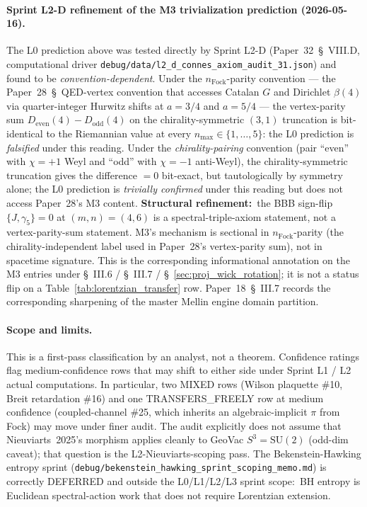 \documentclass[11pt]{article}
\begin{document}
\paragraph{Sprint L2-D refinement of the M3 trivialization prediction
(2026-05-16).}
The L0 prediction above was tested directly by Sprint L2-D
(Paper~32~\S~VIII.D, computational driver
\verb|debug/data/l2_d_connes_axiom_audit_31.json|) and found to be
\emph{convention-dependent}.  Under the
$n_{\mathrm{Fock}}$-parity convention --- the Paper~28~\S~QED-vertex
convention that accesses Catalan $G$ and Dirichlet $\beta(4)$ via
quarter-integer Hurwitz shifts at $a = 3/4$ and $a = 5/4$ --- the
vertex-parity sum $D_{\mathrm{even}}(4) - D_{\mathrm{odd}}(4)$ on the
chirality-symmetric $(3, 1)$ truncation is bit-identical to the
Riemannian value at every $n_{\max} \in \{1, \ldots, 5\}$: the L0
prediction is \emph{falsified} under this reading.  Under the
\emph{chirality-pairing} convention (pair ``even'' with $\chi = +1$
Weyl and ``odd'' with $\chi = -1$ anti-Weyl), the chirality-symmetric
truncation gives the difference $= 0$ bit-exact, but tautologically
by symmetry alone; the L0 prediction is \emph{trivially confirmed}
under this reading but does not access Paper~28's M3 content.
\textbf{Structural refinement:}\ the BBB sign-flip
$\{J, \gamma_5\} = 0$ at $(m, n) = (4, 6)$ is a
spectral-triple-axiom statement, not a vertex-parity-sum statement.
M3's mechanism is sectional in $n_{\mathrm{Fock}}$-parity (the chirality-independent
label used in Paper~28's vertex-parity sum), not in spacetime
signature.  This is the corresponding informational annotation on the
M3 entries under \S~III.6 / \S~III.7 / \S~\ref{sec:proj_wick_rotation};
it is not a status flip on a Table~\ref{tab:lorentzian_transfer} row.
Paper~18~\S~III.7 records the corresponding sharpening of the master
Mellin engine domain partition.

\paragraph{Scope and limits.}
This is a first-pass classification by an analyst, not a theorem.
Confidence ratings flag medium-confidence rows that may shift to
either side under Sprint L1 / L2 actual computations.  In particular,
two MIXED rows (Wilson plaquette \#10, Breit retardation \#16) and
one TRANSFERS\_FREELY row at medium confidence (coupled-channel
\#25, which inherits an algebraic-implicit $\pi$ from Fock) may
move under finer audit.  The audit explicitly does not assume that
Nieuviarts~2025's morphism applies cleanly to GeoVac
$S^3 = \mathrm{SU}(2)$ (odd-dim caveat); that question is the
L2-Nieuviarts-scoping pass.  The Bekenstein-Hawking entropy sprint
(\texttt{debug/bekenstein\_hawking\_sprint\_scoping\_memo.md}) is
correctly DEFERRED and outside the L0/L1/L2/L3 sprint scope:\ BH
entropy is Euclidean spectral-action work that does not require
Lorentzian extension.
\end{document}
